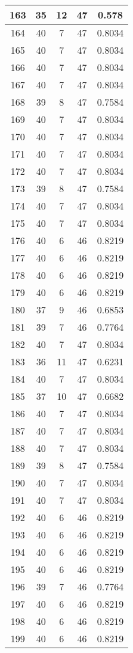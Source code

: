 \documentclass[letterpaper, 12pt]{article}
\begin{document}
\begin{longtable}{|c|c|c|c|c|}
\hline
163 & 35 & 12 & 47 & 0.578 \\
\hline
164 & 40 & 7 & 47 & 0.8034 \\
\hline
165 & 40 & 7 & 47 & 0.8034 \\
\hline
166 & 40 & 7 & 47 & 0.8034 \\
\hline
167 & 40 & 7 & 47 & 0.8034 \\
\hline
168 & 39 & 8 & 47 & 0.7584 \\
\hline
169 & 40 & 7 & 47 & 0.8034 \\
\hline
170 & 40 & 7 & 47 & 0.8034 \\
\hline
171 & 40 & 7 & 47 & 0.8034 \\
\hline
172 & 40 & 7 & 47 & 0.8034 \\
\hline
173 & 39 & 8 & 47 & 0.7584 \\
\hline
174 & 40 & 7 & 47 & 0.8034 \\
\hline
175 & 40 & 7 & 47 & 0.8034 \\
\hline
176 & 40 & 6 & 46 & 0.8219 \\
\hline
177 & 40 & 6 & 46 & 0.8219 \\
\hline
178 & 40 & 6 & 46 & 0.8219 \\
\hline
179 & 40 & 6 & 46 & 0.8219 \\
\hline
180 & 37 & 9 & 46 & 0.6853 \\
\hline
181 & 39 & 7 & 46 & 0.7764 \\
\hline
182 & 40 & 7 & 47 & 0.8034 \\
\hline
183 & 36 & 11 & 47 & 0.6231 \\
\hline
184 & 40 & 7 & 47 & 0.8034 \\
\hline
185 & 37 & 10 & 47 & 0.6682 \\
\hline
186 & 40 & 7 & 47 & 0.8034 \\
\hline
187 & 40 & 7 & 47 & 0.8034 \\
\hline
188 & 40 & 7 & 47 & 0.8034 \\
\hline
189 & 39 & 8 & 47 & 0.7584 \\
\hline
190 & 40 & 7 & 47 & 0.8034 \\
\hline
191 & 40 & 7 & 47 & 0.8034 \\
\hline
192 & 40 & 6 & 46 & 0.8219 \\
\hline
193 & 40 & 6 & 46 & 0.8219 \\
\hline
194 & 40 & 6 & 46 & 0.8219 \\
\hline
195 & 40 & 6 & 46 & 0.8219 \\
\hline
196 & 39 & 7 & 46 & 0.7764 \\
\hline
197 & 40 & 6 & 46 & 0.8219 \\
\hline
198 & 40 & 6 & 46 & 0.8219 \\
\hline
199 & 40 & 6 & 46 & 0.8219 \\
\hline
\end{longtable}
\end{document}
